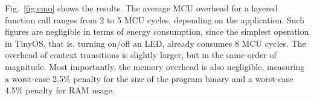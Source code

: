 
 Fig.~\ref{fig:cmo} shows the results. The average MCU overhead for a layered function
call ranges from 2 to 5 MCU cycles, depending on the application. Such figures
are negligible in terms of energy consumption, since the simplest operation in
TinyOS, that is, turning on/off an LED, already consumes 8 MCU cycles. The
overhead of context transitions is slightly larger, but in the same order of
magnitude. Most importantly, the memory overhead is also negligible, measuring a
worst-case 2.5\% penalty for the size of the program binary and a worst-case
4.5\% penalty for RAM usage.



